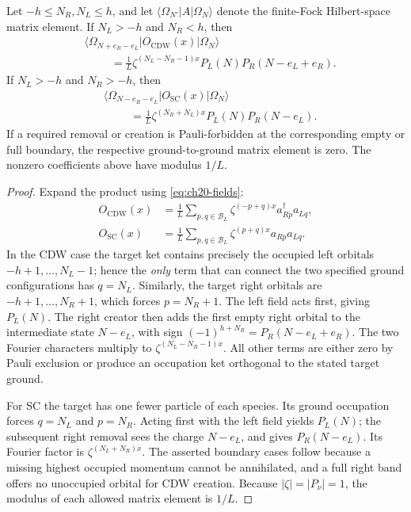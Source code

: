 \begin{proposition}
\label{prop:ch20-ground-coeff}
Let \(-h\leq N_R,N_L\leq h\), and let
\(\langle\Omega_{N'}|A|\Omega_N\rangle\) denote the finite-Fock
Hilbert-space matrix element.  If \(N_L>-h\) and \(N_R<h\), then
\begin{align}
 &\langle\Omega_{N+e_R-e_L}|
                O_{\mathrm{CDW}}(x)|\Omega_N\rangle\\
 &\hspace{1cm}=\frac1L
     \zeta^{(N_L-N_R-1)x}
     P_L(N)P_R(N-e_L+e_R).
 \label{eq:ch20-cdw-ground}
\end{align}
If \(N_L>-h\) and \(N_R>-h\), then
\begin{align}
 &\langle\Omega_{N-e_R-e_L}|
                O_{\mathrm{SC}}(x)|\Omega_N\rangle\\
 &\hspace{1cm}=\frac1L
     \zeta^{(N_R+N_L)x}
     P_L(N)P_R(N-e_L).
 \label{eq:ch20-sc-ground}
\end{align}
If a required removal or creation is Pauli-forbidden at the corresponding
empty or full boundary, the respective ground-to-ground matrix element is
zero.  The nonzero coefficients above have modulus \(1/L\).
\end{proposition}
\begin{proof}
Expand the product using \eqref{eq:ch20-fields}:
\begin{align*}
 O_{\mathrm{CDW}}(x)
  &=\frac1L\sum_{p,q\in\mathcal B_L}
      \zeta^{(-p+q)x}a_{Rp}^{\dagger}a_{Lq},\\
 O_{\mathrm{SC}}(x)
  &=\frac1L\sum_{p,q\in\mathcal B_L}
      \zeta^{(p+q)x}a_{Rp}a_{Lq}.
\end{align*}
In the CDW case the target ket contains precisely the occupied left
orbitals \(-h+1,\ldots,N_L-1\); hence the \emph{only} term that
can connect the two specified ground configurations has \(q=N_L\).
Similarly, the target right orbitals are \(-h+1,\ldots,N_R+1\),
which forces \(p=N_R+1\).  The left field acts first, giving
\(P_L(N)\).  The right creator then adds the first empty right
orbital to the intermediate state \(N-e_L\), with sign
\((-1)^{h+N_R}=P_R(N-e_L+e_R)\).  The two Fourier characters
multiply to \(\zeta^{(N_L-N_R-1)x}\).  All other terms are either
zero by Pauli exclusion or produce an occupation ket orthogonal to
the stated target ground.

For SC the target has one fewer particle of each species.  Its ground
occupation forces \(q=N_L\) and \(p=N_R\).  Acting first with the
left field yields \(P_L(N)\); the subsequent right removal sees the
charge \(N-e_L\), and gives \(P_R(N-e_L)\).  Its Fourier factor is
\(\zeta^{(N_L+N_R)x}\).  The asserted boundary cases follow because
a missing highest occupied momentum cannot be annihilated, and a full
right band offers no unoccupied orbital for CDW creation.  Because
\(|\zeta|=|P_\nu|=1\), the modulus of each allowed matrix element
is \(1/L\).
\end{proof}

